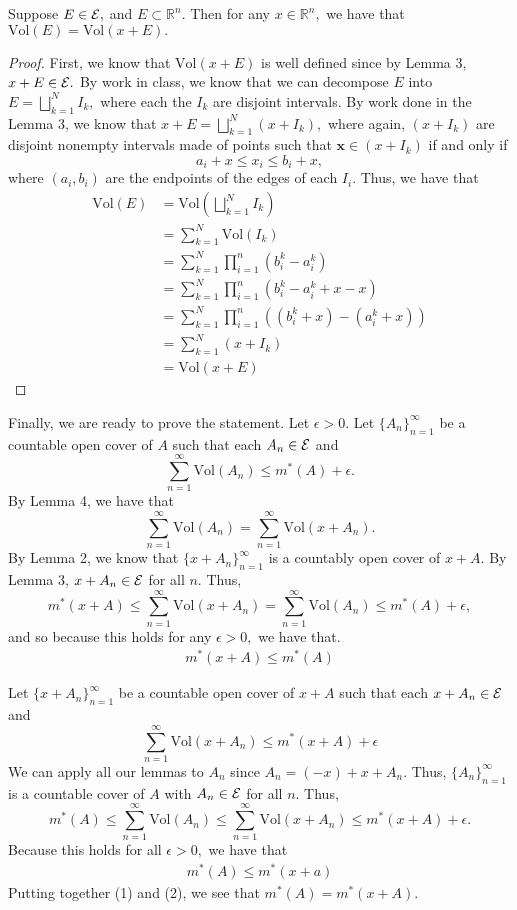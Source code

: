 \documentclass[11pt]{article}
\newcommand{\Vol}{\text{Vol}}
\newcommand{\bbR}{\mathbb{R}}
\begin{document}
\begin{solution}
    \begin{lemma}
        Suppose $E \in \cal E,$ and $E \subset \bbR^n.$ Then for any $x\in \bbR^n,$ we have that $\Vol(E) = \Vol(x + E).$ 
    \end{lemma}
    \begin{proof}
        First, we know that $\Vol(x + E)$ is well defined since by Lemma 3, $x + E \in \cal E.$ By work in class, we know that we can decompose $E$ into $E = \bigsqcup_{k=1}^N I_k,$ where each the $I_k$ are disjoint intervals. By work done in the Lemma 3, we know that $x + E = \bigsqcup_{k=1}^N (x + I_k),$ where again, $(x + I_k)$ are disjoint nonempty intervals made of points such that $\textbf{x} \in (x + I_k)$ if and only if 
        \[a_i  + x \leq x_i \leq b_i + x,\] where $(a_i, b_i)$ are the endpoints of the edges of each $I_i.$ Thus, we have that 
        \begin{align*}
            \Vol(E) &= \Vol(\bigsqcup_{k=1}^N I_k)\\
            &= \sum_{k=1}^N \Vol(I_k)\\
            &= \sum_{k=1}^N \prod_{i=1}^n(b_i^k - a_i^k)\\
            &= \sum_{k=1}^N \prod_{i=1}^n(b_i^k - a_i^k + x - x)\\
            &= \sum_{k=1}^N \prod_{i=1}^n((b_i^k + x) - (a_i^k + x))\\
            &= \sum_{k=1}^N (x + I_k)\\
            &= \Vol(x + E)
        \end{align*}
    \end{proof}
Finally, we are ready to prove the statement. Let $\epsilon>0.$ Let $\{A_n\}_{n=1}^\infty$ be a countable open cover of $A$ such that each $A_n \in \cal E$ and 
\[\sum_{n=1}^\infty \Vol(A_n) \leq m^*(A) + \epsilon.\] By Lemma 4, we have that 
\[\sum_{n=1}^\infty \Vol(A_n) = \sum_{n=1}^\infty\Vol(x + A_n).\] By Lemma 2, we know that $\{x + A_n\}_{n=1}^\infty$ is a countably open cover of $x + A.$ By Lemma 3, $x + A_n \in \cal E$ for all $n.$ Thus, 
\[m^*(x + A) \leq\sum_{n=1}^\infty\Vol(x + A_n) =\sum_{n=1}^\infty \Vol(A_n) \leq m^*(A) + \epsilon,\] and so because this holds for any $\epsilon>0,$ we have that.
\begin{align}
    m^*(x + A) \leq m^*(A)
\end{align}

Let $\{x + A_n\}_{n=1}^\infty$ be a countable open cover of $x + A$ such that each $x + A_n \in \cal E$ and 
\[\sum_{n=1}^\infty \Vol(x + A_n) \leq m^*(x + A) + \epsilon\]
We can apply all our lemmas to $A_n$ since $A_n = (-x) + x + A_n.$ Thus, $\{A_n\}_{n=1}^\infty$ is a countable cover of $A$ with $A_n \in \cal E$ for all $n.$  Thus, 
\[m^*(A) \leq \sum_{n=1}^\infty \Vol(A_n) \leq \sum_{n=1}^\infty \Vol(x + A_n) \leq m^*(x + A) + \epsilon.\] Because this holds for all $\epsilon>0,$ we have that 
\begin{align}
    m^*(A) \leq m^*(x + a)
\end{align}
Putting together (1) and (2), we see that $m^*(A) = m^*(x + A).$
\end{solution}
\end{document}
